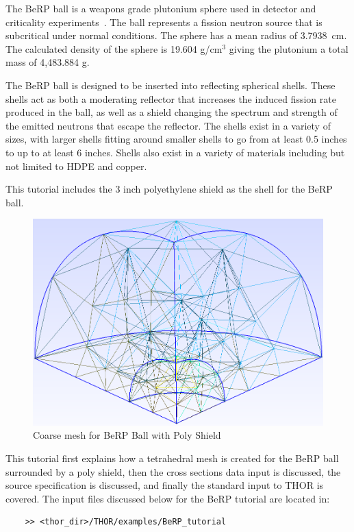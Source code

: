 The BeRP ball is a weapons grade plutonium sphere used in detector and criticality experiments~\cite{BeRP_report}.
The ball represents a fission neutron source that is subcritical under normal conditions.
The sphere has a mean radius of 3.7938~cm.
The calculated density of the sphere is 19.604 g/cm$^3$ giving the plutonium a total mass of 4,483.884 g.

The BeRP ball is designed to be inserted into reflecting spherical shells.
These shells act as both a moderating reflector that increases the induced fission rate produced in the ball, as well as a shield changing the spectrum and strength of the emitted neutrons that escape the reflector.
The shells exist in a variety of sizes, with larger shells fitting around smaller shells to go from at least 0.5 inches to up to at least 6 inches.
Shells also exist in a variety of materials including but not limited to \ac{HDPE} and copper.

This tutorial includes the 3 inch polyethylene shield as the shell for the BeRP ball.

\begin{figure}[th]
  \includegraphics[width=1.0\textwidth]{chapters/tutorials/figures/berp_coarse.png}
  \caption{Coarse mesh for BeRP Ball with Poly Shield}
  \label{fig:berp_coarse}
\end{figure}

This tutorial first explains how a tetrahedral mesh is created for the BeRP ball surrounded by a poly shield, then the cross sections data input is discussed, the source specification is discussed, and finally the standard input to THOR is covered.
The input files discussed below for the BeRP tutorial are located in:
\begin{verbatim}
    >> <thor_dir>/THOR/examples/BeRP_tutorial
\end{verbatim}

